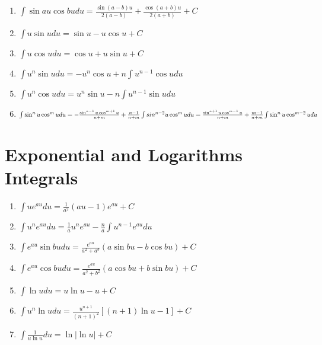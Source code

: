 \documentclass[12pt, letterpaper]{article}
\begin{document}
\begin{enumerate}
  \item $\int \limits \sin au \cos bu du = \frac{\sin(a-b)u}{2(a-b)} + \frac{\cos(a+b)u}{2(a+b)} +C$
  \item $\int \limits u \sin u du = \sin u - u \cos u +C$
  \item $\int \limits u \cos u du = \cos u + u \sin u +C$
  \item $\int \limits u ^n \sin u du = -u ^n \cos u + n \int \limits u ^{n-1} \cos u du$
  \item $\int \limits u ^n \cos u du = u ^n \sin u - n \int \limits u ^{n-1} \sin u du$
  \item $\int \limits \sin ^n u \cos ^m u du = -\frac{\sin ^{n-1} u \cos ^{m+1} u}{n+m} + \frac{n-1}{n+m} \int \limits sin^{n-2} u \cos ^m u du\\
  = \frac{\sin ^{n+1} u \cos ^{m-1} u}{n+m} + \frac{m-1}{n+m} \int \limits \sin ^n u \cos^{m-2} u du$
\end{enumerate}

\section{Exponential and Logarithms Integrals}
\begin{enumerate}
  \item $\int \limits u e ^{au} du = \frac{1}{a^2} (au-1) e^{au} +C$
  \item $\int \limits u ^n e ^{au} du = \frac{1}{a} u ^n e^{au} - \frac{n}{a} \int \limits u ^{n-1} e ^{au} du$
  \item $\int \limits e ^{au} \sin bu du = \frac{e^{au}}{a^2 + a^b} (a \sin bu - b \cos bu) +C$
  \item $\int \limits e^{au} \cos bu du = \frac{e^{au}}{a^2 + b^2} (a \cos bu + b \sin bu) +C$
  \item $\int \limits \ln u du = u \ln u - u + C$
  \item $\int \limits u ^n \ln u du = \frac{u^{n+1}}{(n+1)^2} [(n+1)\ln u-1] +C$
  \item $\int \limits \frac{1}{u \ln u} du = \ln | \ln u | +C$
\end{enumerate}
\end{document}
